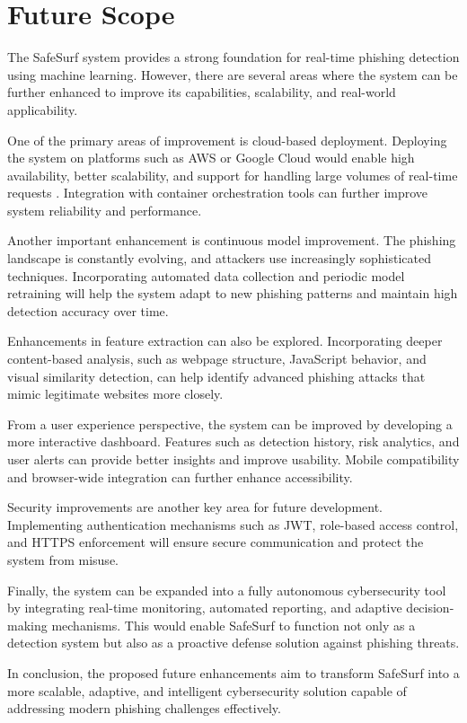 \chapter{Future Scope}

The SafeSurf system provides a strong foundation for real-time phishing detection using machine learning. However, there are several areas where the system can be further enhanced to improve its capabilities, scalability, and real-world applicability.

One of the primary areas of improvement is cloud-based deployment. Deploying the system on platforms such as AWS or Google Cloud would enable high availability, better scalability, and support for handling large volumes of real-time requests \cite{ref14}. Integration with container orchestration tools can further improve system reliability and performance.

Another important enhancement is continuous model improvement. The phishing landscape is constantly evolving, and attackers use increasingly sophisticated techniques. Incorporating automated data collection and periodic model retraining will help the system adapt to new phishing patterns and maintain high detection accuracy over time.

Enhancements in feature extraction can also be explored. Incorporating deeper content-based analysis, such as webpage structure, JavaScript behavior, and visual similarity detection, can help identify advanced phishing attacks that mimic legitimate websites more closely.

From a user experience perspective, the system can be improved by developing a more interactive dashboard. Features such as detection history, risk analytics, and user alerts can provide better insights and improve usability. Mobile compatibility and browser-wide integration can further enhance accessibility.

Security improvements are another key area for future development. Implementing authentication mechanisms such as JWT, role-based access control, and HTTPS enforcement will ensure secure communication and protect the system from misuse.

Finally, the system can be expanded into a fully autonomous cybersecurity tool by integrating real-time monitoring, automated reporting, and adaptive decision-making mechanisms. This would enable SafeSurf to function not only as a detection system but also as a proactive defense solution against phishing threats.

In conclusion, the proposed future enhancements aim to transform SafeSurf into a more scalable, adaptive, and intelligent cybersecurity solution capable of addressing modern phishing challenges effectively.
